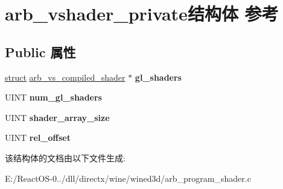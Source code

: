 \hypertarget{structarb__vshader__private}{}\section{arb\+\_\+vshader\+\_\+private结构体 参考}
\label{structarb__vshader__private}
\subsection*{Public 属性}
\begin{DoxyCompactItemize}
\item 
\mbox{\label{structarb__vshader__private_a55e062c7f32f5e49513be1943a36f301}} 
\hyperlink{interfacestruct}{struct} \hyperlink{structarb__vs__compiled__shader}{arb\+\_\+vs\+\_\+compiled\+\_\+shader} $\ast$ {\bfseries gl\+\_\+shaders}
\item 
\mbox{\label{structarb__vshader__private_a42b361ab5e63c7d79f4748989e40eebc}} 
U\+I\+NT {\bfseries num\+\_\+gl\+\_\+shaders}
\item 
\mbox{\label{structarb__vshader__private_aacc78038c1ea0168b5c345e47bdd8f0c}} 
U\+I\+NT {\bfseries shader\+\_\+array\+\_\+size}
\item 
\mbox{\label{structarb__vshader__private_a369ea9dbb720559994a3f35398d36ccb}} 
U\+I\+NT {\bfseries rel\+\_\+offset}
\end{DoxyCompactItemize}


该结构体的文档由以下文件生成\+:\begin{DoxyCompactItemize}
\item 
E\+:/\+React\+O\+S-\/0../dll/directx/wine/wined3d/arb\+\_\+program\+\_\+shader.\+c\end{DoxyCompactItemize}
